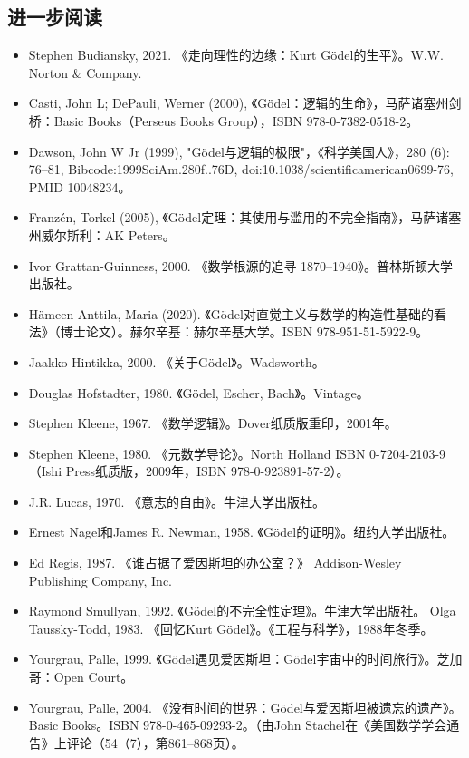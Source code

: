 \subsection{进一步阅读}  
\begin{itemize}
\item Stephen Budiansky, 2021. 《走向理性的边缘：Kurt Gödel的生平》。W.W. Norton & Company.  
\item Casti, John L; DePauli, Werner (2000), 《Gödel：逻辑的生命》，马萨诸塞州剑桥：Basic Books（Perseus Books Group），ISBN 978-0-7382-0518-2。  
\item Dawson, John W Jr (1999), "Gödel与逻辑的极限"，《科学美国人》，280 (6): 76–81, Bibcode:1999SciAm.280f..76D, doi:10.1038/scientificamerican0699-76, PMID 10048234。  
\item Franzén, Torkel (2005), 《Gödel定理：其使用与滥用的不完全指南》，马萨诸塞州威尔斯利：AK Peters。  
\item Ivor Grattan-Guinness, 2000. 《数学根源的追寻 1870–1940》。普林斯顿大学出版社。  
\item Hämeen-Anttila, Maria (2020). 《Gödel对直觉主义与数学的构造性基础的看法》（博士论文）。赫尔辛基：赫尔辛基大学。ISBN 978-951-51-5922-9。  
\item Jaakko Hintikka, 2000. 《关于Gödel》。Wadsworth。  
\item Douglas Hofstadter, 1980. 《Gödel, Escher, Bach》。Vintage。  
\item Stephen Kleene, 1967. 《数学逻辑》。Dover纸质版重印，2001年。  
\item Stephen Kleene, 1980. 《元数学导论》。North Holland ISBN 0-7204-2103-9（Ishi Press纸质版，2009年，ISBN 978-0-923891-57-2）。  
\item J.R. Lucas, 1970. 《意志的自由》。牛津大学出版社。  
\item Ernest Nagel和James R. Newman, 1958. 《Gödel的证明》。纽约大学出版社。  
\item Ed Regis, 1987. 《谁占据了爱因斯坦的办公室？》 Addison-Wesley Publishing Company, Inc.  
\item Raymond Smullyan, 1992. 《Gödel的不完全性定理》。牛津大学出版社。  
Olga Taussky-Todd, 1983. 《回忆Kurt Gödel》。《工程与科学》，1988年冬季。  
\item Yourgrau, Palle, 1999. 《Gödel遇见爱因斯坦：Gödel宇宙中的时间旅行》。芝加哥：Open Court。  
\item Yourgrau, Palle, 2004. 《没有时间的世界：Gödel与爱因斯坦被遗忘的遗产》。Basic Books。ISBN 978-0-465-09293-2。（由John Stachel在《美国数学学会通告》上评论（54（7），第861–868页）。
\end{itemize}
